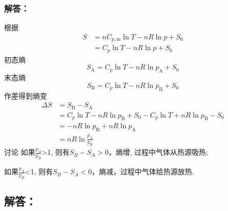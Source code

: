 \subsubsection{解答：}
根据
\begin{equation}
    \begin{aligned}
        S&=nC_{p,\mathrm{m}}\ln T-nR\ln p+S_0
\\
&=C_p\ln T-nR\ln p+S_0
    \end{aligned}
\end{equation}
初态熵
\begin{equation}
    S_{\mathrm{A}}=C_p\ln T-nR\ln p_{\mathrm{A}}+S_0
\end{equation}
末态熵
\begin{equation}
    S_{\mathrm{B}}=C_p\ln T-nR\ln p_{\mathrm{B}}+S_0
\end{equation}
作差得到熵变
\begin{equation}
    \begin{aligned}
        \Delta S&=S_{\mathrm{B}}-S_{\mathrm{A}}
\\
&=C_p\ln T-nR\ln p_{\mathrm{B}}+S_0-C_p\ln T+nR\ln p_{\mathrm{B}}-S_0
\\
&=-nR\ln p_{\mathrm{B}}+nR\ln p_{\mathrm{A}}
\\
&=nR\ln \frac{p_{\mathrm{A}}}{p_{\mathrm{B}}}
    \end{aligned}
\end{equation}
讨论
如果$\frac{p_{A}}{p_{B}}$>1, 则有$S_{B}-S_{A}>0$，熵增, 过程中气体从热源吸热; 

如果$\frac{p_{A}}{p_{B}}$<1, 则有$S_{B}-S_{A}<0$，熵减，过程中气体给热源放热.




\subsection{解答：}



